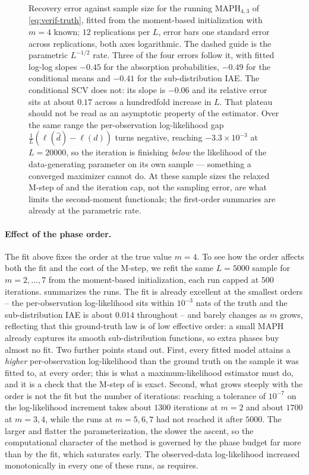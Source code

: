 \documentclass{article}
\newenvironment{aarevision}{}{}
\newcommand{\subchg}[1]{#1}
\begin{document}
\begin{figure}[ht]
\begin{aarevision}
\caption{Recovery error against sample size for the running $\text{MAPH}_{4,3}$ of \eqref{eq:verif-truth}, fitted from the moment-based initialization with $m=4$ known; $12$ replications per $L$, error bars one standard error across replications, both axes logarithmic. The dashed guide is the parametric $L^{-1/2}$ rate. Three of the four errors follow it, with fitted log-log slopes $-0.45$ for the absorption probabilities, $-0.49$ for the conditional means and $-0.41$ for the sub-distribution IAE. The conditional SCV does not: its slope is $-0.06$ and its relative error sits at about $0.17$ across a hundredfold increase in $L$. That plateau should not be read as an asymptotic property of the estimator. Over the same range the per-observation log-likelihood gap $\frac1L(\ell(\hat d)-\ell(d))$ turns negative, reaching $-3.3\times10^{-3}$ at $L=20000$, so the iteration is finishing \emph{below} the likelihood of the data-generating parameter on its own sample --- something a converged maximizer cannot do. At these sample sizes the relaxed M-step of  and the iteration cap, not the sampling error, are what limits the second-moment functionals; the first-order summaries are already at the parametric rate.}
\label{fig:verif-scaling}
\end{aarevision}
\end{figure}

\paragraph{Effect of the phase order.} The fit above fixes the order at the true value $m=4$. To see how the order affects both the fit and the cost of the M-step, we refit the same $L=5000$ sample for $m=2,\ldots,7$ from the moment-based initialization, each run capped at $500$ iterations.  summarizes the runs. The fit is already excellent at the smallest orders -- the per-observation log-likelihood sits within $10^{-3}$ nats of the truth and the sub-distribution IAE is about $0.014$ throughout -- and barely changes as $m$ grows, reflecting that this ground-truth law is of low effective order: a small MAPH already captures its smooth sub-distribution functions, so extra phases buy almost no fit. \subchg{Two further points stand out. First, every fitted model attains a \emph{higher} per-observation log-likelihood than the ground truth on the sample it was fitted to, at every order; this is what a maximum-likelihood estimator must do, and it is a check that the M-step of \Cref{prop:approx-mle} is exact. Second, what grows steeply with the order is not the fit but the number of iterations: reaching a tolerance of $10^{-7}$ on the log-likelihood increment takes about $1300$ iterations at $m=2$ and about $1700$ at $m=3,4$, while the runs at $m=5,6,7$ had not reached it after $5000$. The larger and flatter the parameterization, the slower the ascent, so the computational character of the method is governed by the phase budget far more than by the fit, which saturates early. The observed-data log-likelihood increased monotonically in every one of these runs, as \Cref{cor:monotone} requires.}
\end{document}
